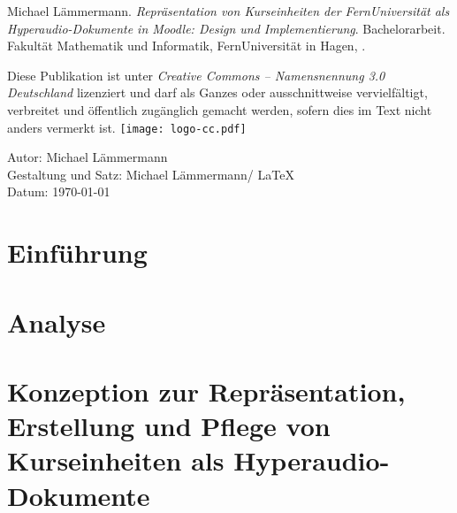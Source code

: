 \documentclass[twoside,bibliography=totoc,openany]{fumi}
\newcommand{\thesistitle}{Repräsentation von Kurseinheiten der FernUniversität als Hyperaudio-Dokumente in Moodle: Design und Implementierung}
\newcommand{\thesisauthor}{Michael Lämmermann}
\newcommand{\thesistype}{Bachelorarbeit} %
\begin{document}
{\small

\thesisauthor. \textit{\thesistitle}. \thesistype. Fakultät Mathematik und Informatik, FernUniversität in Hagen, \the\year. %
\\\vfill

Diese Publikation ist unter \emph{Creative Commons -- Namensnennung 3.0 Deutschland} lizenziert und darf als Ganzes oder ausschnittweise vervielfältigt, verbreitet und öffentlich zugänglich gemacht werden, sofern dies im Text nicht anders vermerkt ist.\newline\vspace{10pt}
\hspace{-9pt}\texttt{[image: logo-cc.pdf]}
\\\vspace{10pt}

Autor: \thesisauthor\\
Gestaltung und Satz: \thesisauthor / \LaTeX\\
Datum: \today\\
\cleardoublepage
}

\pagestyle{headings}
\tableofcontents


\chapter{Einführung}



\chapter{Analyse}



\chapter{Konzeption zur Repräsentation, Erstellung und Pflege von Kurseinheiten als Hyperaudio-Dokumente}

\end{document}
